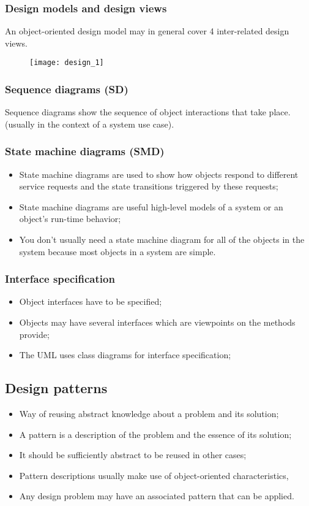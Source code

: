 \documentclass[../ESOF_notes.tex]{subfiles}
\begin{document}
\subsubsection{Design models and design views}
An object-oriented design model may in general cover 4 inter-related design views.
\begin{figure}[H]
    \centering
    \texttt{[image: design\_1]}
\end{figure}

\subsubsection{Sequence diagrams (SD)}
Sequence diagrams show the sequence of object interactions that take place. (usually in the context of a system use case).

\subsubsection{State machine diagrams (SMD)}
\begin{itemize}
    \item State machine diagrams are used to show how objects
          respond to different service requests and the state transitions triggered by these requests;
    \item State machine diagrams are useful high-level models of a
          system or an object’s run-time behavior;
    \item You don’t usually need a state machine diagram for all of
          the objects in the system because most objects in a system are simple.
\end{itemize}

\subsubsection{Interface specification}
\begin{itemize}
    \item Object interfaces have to be specified;
    \item Objects may have several interfaces which are viewpoints
          on the methods provide;
    \item The UML uses class diagrams for interface specification;
\end{itemize}
\subsection{Design patterns}
\begin{itemize}
    \item Way of reusing abstract knowledge about a problem and its solution;
    \item A pattern is a description of the problem and the essence
          of its solution;
    \item It should be sufficiently abstract to be reused in other cases;
    \item Pattern descriptions usually make use of object-oriented
          characteristics,
    \item Any design problem may have an associated pattern that can be applied.
\end{itemize}
\end{document}
